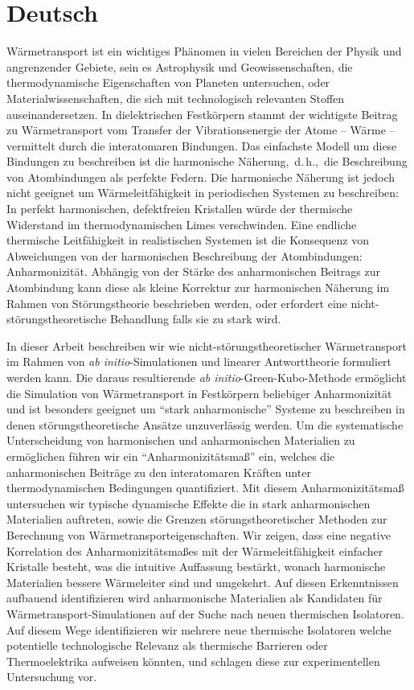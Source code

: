 \section*{Deutsch}

Wärmetransport ist ein wichtiges Phänomen in vielen Bereichen der Physik und angrenzender Gebiete, sein es Astrophysik und Geowissenschaften, die thermodynamische Eigenschaften von Planeten untersuchen, oder Materialwissenschaften, die sich mit technologisch relevanten Stoffen auseinandersetzen. In dielektrischen Festkörpern stammt der wichtigste Beitrag zu Wärmetransport vom Transfer der Vibrationsenergie der Atome -- Wärme -- vermittelt durch die interatomaren Bindungen. Das einfachste Modell um diese Bindungen zu beschreiben ist die harmonische Näherung,~d.\,h.,~die Beschreibung von Atombindungen als perfekte Federn. Die harmonische Näherung ist jedoch nicht geeignet um Wärmeleitfähigkeit in periodischen Systemen zu beschreiben: In perfekt harmonischen, defektfreien Kristallen würde der thermische Widerstand im thermodynamischen Limes verschwinden. Eine endliche thermische Leitfähigkeit in realistischen Systemen ist die Konsequenz von Abweichungen von der harmonischen Beschreibung der Atombindungen: Anharmonizität. Abhängig von der Stärke des anharmonischen Beitrags zur Atombindung kann diese als kleine Korrektur zur harmonischen Näherung im Rahmen von Störungstheorie beschrieben werden, oder erfordert eine nicht-störungstheoretische Behandlung falls sie zu stark wird.

In dieser Arbeit beschreiben wir wie nicht-störungstheoretischer Wärmetransport im Rahmen von \emph{ab initio}-Simulationen und linearer Antworttheorie formuliert werden kann. Die daraus resultierende \emph{ab initio}-Green-Kubo-Methode ermöglicht die Simulation von Wärmetransport in Festkörpern beliebiger Anharmonizität und ist besonders geeignet um ``stark anharmonische'' Systeme zu beschreiben in denen störungstheoretische Ansätze unzuverlässig werden. Um die systematische Unterscheidung von harmonischen und anharmonischen Materialien zu ermöglichen führen wir ein ``Anharmonizitätsmaß'' ein, welches die anharmonischen Beiträge zu den interatomaren Kräften unter thermodynamischen Bedingungen quantifiziert. Mit diesem Anharmonizitätsmaß untersuchen wir typische dynamische Effekte die in stark anharmonischen Materialien auftreten, sowie die Grenzen störungstheoretischer Methoden zur Berechnung von Wärmetransporteigenschaften. Wir zeigen, dass eine negative Korrelation des Anharmonizitätsmaßes mit der Wärmeleitfähigkeit einfacher Kristalle besteht, was die intuitive Auffassung bestärkt, wonach harmonische Materialien bessere Wärmeleiter sind und umgekehrt. Auf diesen Erkenntnissen aufbauend identifizieren wird anharmonische Materialien als Kandidaten für Wärmetransport-Simulationen auf der Suche nach neuen thermischen Isolatoren. Auf diesem Wege identifizieren wir mehrere neue thermische Isolatoren welche potentielle technologische Relevanz als thermische Barrieren oder Thermoelektrika aufweisen könnten, und schlagen diese zur experimentellen Untersuchung vor.